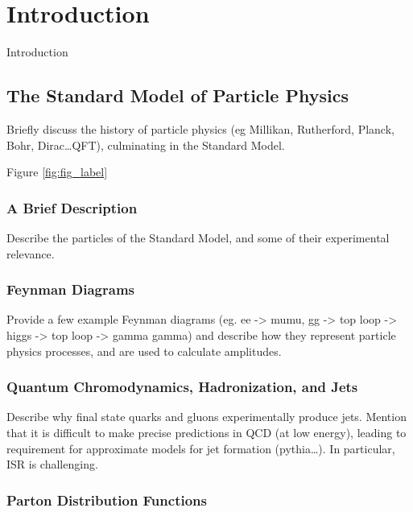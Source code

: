 \chapter{Introduction}

Introduction

\section{The Standard Model of Particle Physics} \label{sec:standardmodel}

Briefly discuss the history of particle physics (eg Millikan, Rutherford, Planck, Bohr, Dirac\ldots QFT), culminating in the Standard Model.



  Figure \ref{fig:fig_label}

  \subsection{A Brief Description} \label{sec:SMdescription}

  Describe the particles of the Standard Model, and some of their experimental relevance.

  \subsection{Feynman Diagrams} \label{sec:feyndiags}

  Provide a few example Feynman diagrams (eg. ee -> mumu, gg -> top loop -> higgs -> top loop -> gamma gamma) and describe how they represent particle physics processes, and are used to calculate amplitudes. 

  \subsection{Quantum Chromodynamics, Hadronization, and Jets} \label{sec:hadronization}

  Describe why final state quarks and gluons experimentally produce jets. 
  Mention that it is difficult to make precise predictions in QCD (at low energy), leading to requirement for approximate models for jet formation (pythia\ldots).
  In particular, ISR is challenging.

  \subsection{Parton Distribution Functions} \label{sec:PDFs}

